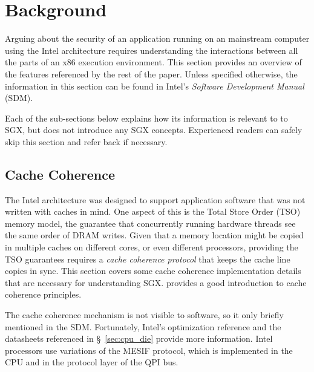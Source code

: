 \section{Background}
\label{sec:background}

Arguing about the security of an application running on an mainstream computer
using the Intel architecture requires understanding the interactions between
all the parts of an x86 execution environment. This section provides an
overview of the features referenced by the rest of the paper. Unless specified
otherwise, the information in this section can be found in Intel's
\textit{Software Development Manual} \cite{intel2014sdm} (SDM).

Each of the sub-sections below explains how its information is relevant to
to SGX, but does not introduce any SGX concepts. Experienced readers can safely
skip this section and refer back if necessary.












\subsection{Cache Coherence}
\label{sec:cache_coherence}

The Intel architecture was designed to support application software that was
not written with caches in mind. One aspect of this is the Total Store Order
(TSO) \cite{owens2009tso} memory model, the guarantee that concurrently running
hardware threads see the same order of DRAM writes. Given that a memory
location might be copied in multiple caches on different cores, or even
different processors, providing the TSO guarantees requires a \textit{cache
coherence protocol} that keeps the cache line copies in sync. This section
covers some cache coherence implementation details that are necessary for
understanding SGX. \cite{hennessy2012architecture} provides a good introduction
to cache coherence principles.

The cache coherence mechanism is not visible to software, so it only briefly
mentioned in the SDM. Fortunately, Intel's optimization reference
\cite{intel2014optimization} and the datasheets referenced in
\S~\ref{sec:cpu_die} provide more information. Intel processors use variations
of the MESIF \cite{goodman2009mesif} protocol, which is implemented in the CPU
and in the protocol layer of the QPI bus.

